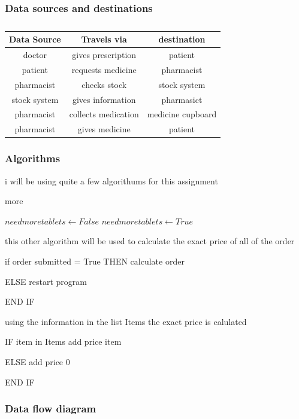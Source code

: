 \subsubsection{Data sources and destinations}
\begin{table}[t]
\begin{tabular}{|c|c|c|}
\hline
Data Source & Travels via & destination\\
\hline
doctor & gives prescription & patient\\
\hline
patient & requests medicine & pharmacist\\
\hline
pharmacist & checks stock & stock system\\
\hline 
stock system & gives information & pharmasict\\
\hline
pharmacist & collects medication & medicine cupboard\\
\hline
pharmacist & gives medicine & patient\\
\hline
\end{tabular}
\caption{}
\label{tab:}
\end{table}
\subsubsection{Algorithms}
i will be using quite a few algorithums for this assignment
\begin{algorithm}[H]
    \caption{more }
\begin{algorithmic}
		\State $need more tablets \gets False$
	\Else
		\State $need more tablets \gets True$ 
	\EndIf
\EndFor
\end{algorithmic}
\end{algorithm}

this other algorithm will be used to calculate the exact price of all of the order 

if order submitted = True THEN
		calculate order

ELSE 
		restart program

END IF

\space using the information in the list Items the exact price is calulated

IF item in Items
		add price item

ELSE
		add price 0

END IF

\subsubsection{Data flow diagram}




